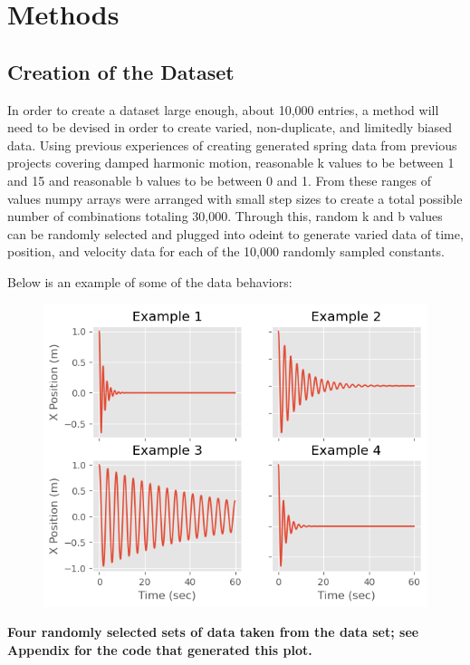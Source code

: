 \documentclass[12pt]{article}
\begin{document}
	\section*{ Methods}

	\subsection*{Creation of the Dataset}

	In order to create a dataset large enough, about 10,000 entries, a method will need to be devised in order to create varied, non-duplicate, and limitedly biased data. Using previous experiences of creating generated spring data from previous projects covering damped harmonic motion, reasonable k values to be between 1 and 15 and reasonable b values to be between 0 and 1. From these ranges of values numpy arrays were arranged with small step sizes to create a total possible number of combinations totaling 30,000. Through this, random k and b values can be randomly selected and plugged into odeint to generate varied data of time, position, and velocity data for each of the 10,000 randomly sampled constants.

	Below is an example of some of the data behaviors:

	\begin{figure}[H]
		\includegraphics[scale=0.400]{data_example.png}
		\centering
	\end{figure}
	\begin{center}
		\textbf{\scriptsize Four randomly selected sets of data taken from the data set; see Appendix for the code that generated this plot.}
	\end{center}
\end{document}
